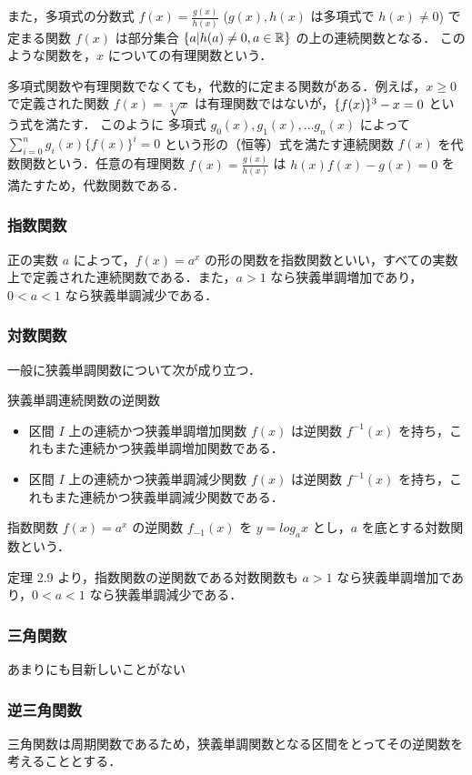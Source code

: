 \documentclass[xelatex,ja=standard,jafont=noto]{bxjsarticle}
\begin{document}
  また，多項式の分数式 $f(x) = \frac{g(x)}{h(x)}$ ($g(x), h(x)$ は多項式で $h(x) \neq 0$) で定まる関数 $f(x)$ は部分集合 $\{a | h(a) \neq 0, a \in \mathbb{R}\}$ の上の連続関数となる．
  このような関数を，$x$ についての有理関数という．
  
  多項式関数や有理関数でなくても，代数的に定まる関数がある．例えば，$x \geq 0$ で定義された関数 $f(x) = \sqrt[3]{x}$ は有理関数ではないが，$\{f(x)\}^3 - x = 0$ という式を満たす．
  このように 多項式 $g_0(x), g_1(x), \dots g_n(x)$ によって $\sum_{i=0}^n g_i(x)\{f(x)\}^i = 0$ という形の（恒等）式を満たす連続関数 $f(x)$ を代数関数という．任意の有理関数 $f(x) = \frac{g(x)}{h(x)}$
  は $h(x)f(x) - g(x) = 0$ を満たすため，代数関数である．

  \subsubsection{指数関数}
  正の実数 $a$ によって，$f(x) = a^x$ の形の関数を指数関数といい，すべての実数上で定義された連続関数である．また，$a > 1$ なら狭義単調増加であり，$0 < a < 1$ なら狭義単調減少である．

  \subsubsection{対数関数}
  一般に狭義単調関数について次が成り立つ．
  \begin{theorem}{狭義単調連続関数の逆関数}{}
    \begin{itemize}
      \item 区間 $I$ 上の連続かつ狭義単調増加関数 $f(x)$ は逆関数 $f^{-1}(x)$ を持ち，これもまた連続かつ狭義単調増加関数である．
      \item 区間 $I$ 上の連続かつ狭義単調減少関数 $f(x)$ は逆関数 $f^{-1}(x)$ を持ち，これもまた連続かつ狭義単調減少関数である．
    \end{itemize}
  \end{theorem}
  指数関数 $f(x) = a^x$ の逆関数 $f_{-1}(x)$ を $y = log_{a}x$ とし，$a$ を底とする対数関数という．
  
  定理 2.9 より，指数関数の逆関数である対数関数も $a > 1$ なら狭義単調増加であり，$0 < a < 1$ なら狭義単調減少である．


  \subsubsection{三角関数}
  あまりにも目新しいことがない

  \subsubsection{逆三角関数}
  三角関数は周期関数であるため，狭義単調関数となる区間をとってその逆関数を考えることとする．
\end{document}
